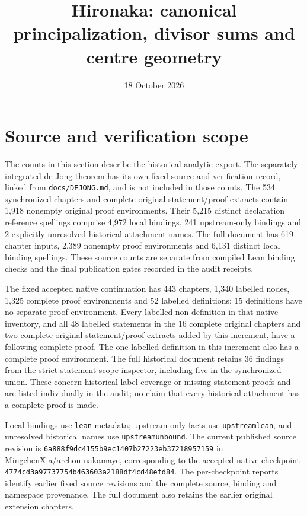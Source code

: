 \documentclass[11pt,a4paper]{article}
\title{Hironaka: canonical principalization, divisor sums and centre geometry}
\author{}
\date{18 October 2026}
\theoremstyle{definition}
\providecommand{\href}[2]{#2}
\begin{document}
\maketitle
\section*{Source and verification scope}
The counts in this section describe the historical analytic export. The
separately integrated de Jong theorem has its own fixed source and
verification record, linked from \texttt{docs/DEJONG.md}, and is not included
in those counts.
The 534 synchronized chapters and complete original statement/proof extracts
contain 1,918 nonempty original proof environments. Their 5,215 distinct
declaration reference spellings comprise 4,972 local bindings, 241 upstream-only
bindings and 2 explicitly unresolved historical attachment names. The full
document has 619 chapter inputs, 2,389 nonempty proof environments and 6,131 distinct
local binding spellings. These source counts are separate from compiled Lean
binding checks and the final publication gates recorded in the audit receipts.

The fixed accepted native continuation has 443 chapters, 1,340 labelled nodes,
1,325 complete proof environments and 52 labelled definitions; 15 definitions
have no separate proof environment. Every labelled non-definition in that
native inventory, and all 48 labelled statements in the 16 complete original
chapters and two complete original statement/proof extracts added by this
increment, have a following complete proof. The one labelled definition in
this increment also has a complete proof environment.
The full historical document retains 36 findings from the strict statement-scope
inspector, including five in the synchronized union. These concern historical
label coverage or missing statement proofs and are listed individually in the
audit; no claim that every historical attachment has a complete proof is made.

Local bindings use \texttt{lean} metadata; upstream-only facts use
\texttt{upstreamlean}, and unresolved historical names use
\texttt{upstreamunbound}. The current published source revision is
\texttt{6a888f9dc4155b9ec1407b27223eb37218957159} in
\href{https://github.com/MingchenXia/archon-nakamaye}{MingchenXia/archon-nakamaye},
corresponding to the accepted native checkpoint
\texttt{4774cd3a97737754b463603a2188df4cd48efd84}.
The per-checkpoint reports identify earlier fixed source revisions and the
complete source, binding and namespace provenance. The full document also
retains the earlier original extension chapters.

\end{document}
